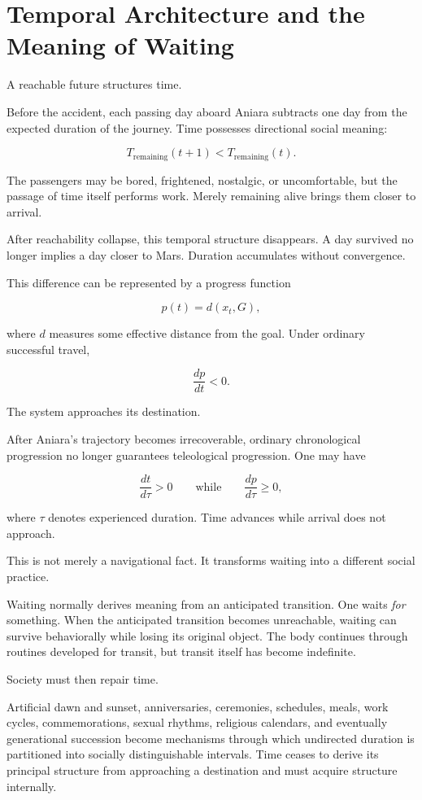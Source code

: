 \documentclass[11pt,oneside]{book}
\theoremstyle{definition}
\theoremstyle{remark}
\begin{document}
\section{Temporal Architecture and the Meaning of Waiting}

A reachable future structures time.

Before the accident, each passing day aboard Aniara subtracts one day from the expected duration of the journey. Time possesses directional social meaning:

\[
T_{\mathrm{remaining}}(t+1)
<
T_{\mathrm{remaining}}(t).
\]

The passengers may be bored, frightened, nostalgic, or uncomfortable, but the passage of time itself performs work. Merely remaining alive brings them closer to arrival.

After reachability collapse, this temporal structure disappears. A day survived no longer implies a day closer to Mars. Duration accumulates without convergence.

This difference can be represented by a progress function

\[
p(t)=d(x_t,G),
\]

where \(d\) measures some effective distance from the goal. Under ordinary successful travel,

\[
\frac{dp}{dt}<0.
\]

The system approaches its destination.

After Aniara's trajectory becomes irrecoverable, ordinary chronological progression no longer guarantees teleological progression. One may have

\[
\frac{dt}{d\tau}>0
\qquad\text{while}\qquad
\frac{dp}{d\tau}\geq0,
\]

where \(\tau\) denotes experienced duration. Time advances while arrival does not approach.

This is not merely a navigational fact. It transforms waiting into a different social practice.

Waiting normally derives meaning from an anticipated transition. One waits \emph{for} something. When the anticipated transition becomes unreachable, waiting can survive behaviorally while losing its original object. The body continues through routines developed for transit, but transit itself has become indefinite.

Society must then repair time.

Artificial dawn and sunset, anniversaries, ceremonies, schedules, meals, work cycles, commemorations, sexual rhythms, religious calendars, and eventually generational succession become mechanisms through which undirected duration is partitioned into socially distinguishable intervals. Time ceases to derive its principal structure from approaching a destination and must acquire structure internally.
\end{document}
